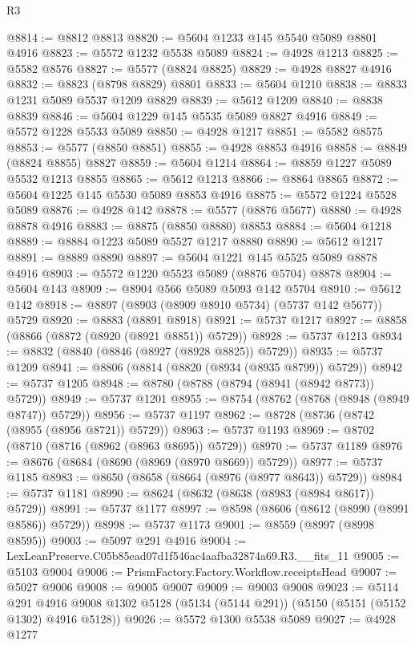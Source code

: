 \begin{lexlean}{R3}
\begin{coremodule}
@8814 := @8812 @8813
@8820 := @5604 @1233 @145 @5540 @5089 @8801 @4916
@8823 := @5572 @1232 @5538 @5089
@8824 := @4928 @1213
@8825 := @5582 @8576
@8827 := @5577 (@8824 @8825)
@8829 := @4928 @8827 @4916
@8832 := @8823 (@8798 @8829) @8801
@8833 := @5604 @1210
@8838 := @8833 @1231 @5089 @5537 @1209 @8829
@8839 := @5612 @1209
@8840 := @8838 @8839
@8846 := @5604 @1229 @145 @5535 @5089 @8827 @4916
@8849 := @5572 @1228 @5533 @5089
@8850 := @4928 @1217
@8851 := @5582 @8575
@8853 := @5577 (@8850 @8851)
@8855 := @4928 @8853 @4916
@8858 := @8849 (@8824 @8855) @8827
@8859 := @5604 @1214
@8864 := @8859 @1227 @5089 @5532 @1213 @8855
@8865 := @5612 @1213
@8866 := @8864 @8865
@8872 := @5604 @1225 @145 @5530 @5089 @8853 @4916
@8875 := @5572 @1224 @5528 @5089
@8876 := @4928 @142
@8878 := @5577 (@8876 @5677)
@8880 := @4928 @8878 @4916
@8883 := @8875 (@8850 @8880) @8853
@8884 := @5604 @1218
@8889 := @8884 @1223 @5089 @5527 @1217 @8880
@8890 := @5612 @1217
@8891 := @8889 @8890
@8897 := @5604 @1221 @145 @5525 @5089 @8878 @4916
@8903 := @5572 @1220 @5523 @5089 (@8876 @5704) @8878
@8904 := @5604 @143
@8909 := @8904 @566 @5089 @5093 @142 @5704
@8910 := @5612 @142
@8918 := @8897 (@8903 (@8909 @8910 @5734) (@5737 @142 @5677)) @5729
@8920 := @8883 (@8891 @8918)
@8921 := @5737 @1217
@8927 := @8858 (@8866 (@8872 (@8920 (@8921 @8851)) @5729))
@8928 := @5737 @1213
@8934 := @8832 (@8840 (@8846 (@8927 (@8928 @8825)) @5729))
@8935 := @5737 @1209
@8941 := @8806 (@8814 (@8820 (@8934 (@8935 @8799)) @5729))
@8942 := @5737 @1205
@8948 := @8780 (@8788 (@8794 (@8941 (@8942 @8773)) @5729))
@8949 := @5737 @1201
@8955 := @8754 (@8762 (@8768 (@8948 (@8949 @8747)) @5729))
@8956 := @5737 @1197
@8962 := @8728 (@8736 (@8742 (@8955 (@8956 @8721)) @5729))
@8963 := @5737 @1193
@8969 := @8702 (@8710 (@8716 (@8962 (@8963 @8695)) @5729))
@8970 := @5737 @1189
@8976 := @8676 (@8684 (@8690 (@8969 (@8970 @8669)) @5729))
@8977 := @5737 @1185
@8983 := @8650 (@8658 (@8664 (@8976 (@8977 @8643)) @5729))
@8984 := @5737 @1181
@8990 := @8624 (@8632 (@8638 (@8983 (@8984 @8617)) @5729))
@8991 := @5737 @1177
@8997 := @8598 (@8606 (@8612 (@8990 (@8991 @8586)) @5729))
@8998 := @5737 @1173
@9001 := @8559 (@8997 (@8998 @8595))
@9003 := @5097 @291 @4916
@9004 := LexLeanPreserve.C05b85ead07d1f546ac4aafba32874a69.R3.__fits_11
@9005 := @5103 @9004
@9006 := PrismFactory.Factory.Workflow.receiptsHead
@9007 := @5027 @9006
@9008 := @9005 @9007
@9009 := @9003 @9008
@9023 := @5114
    @291
    @4916
    @9008
    @1302
    @5128
    (@5134 (@5144 @291))
    (@5150 (@5151 (@5152 @1302) @4916 @5128))
@9026 := @5572 @1300 @5538 @5089
@9027 := @4928 @1277

\end{coremodule}
\end{lexlean}
